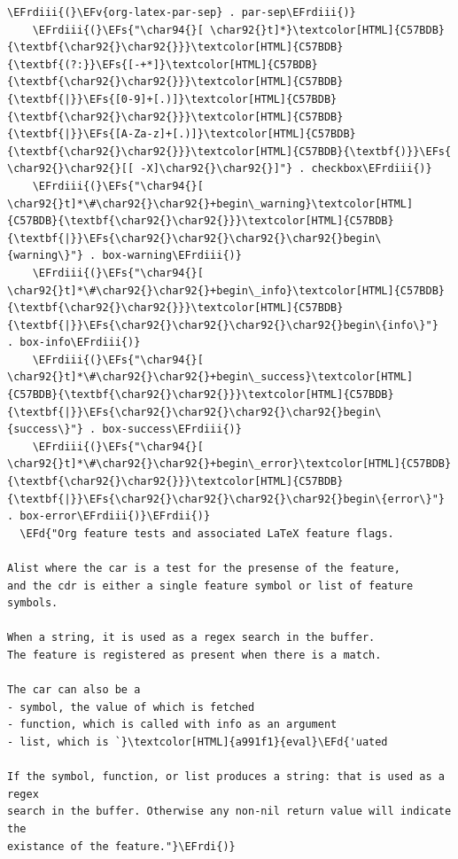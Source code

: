 \documentclass{scrartcl}
\newcommand{\EFd}[1]{\textcolor{EFd}{#1}} %
\newcommand{\EFs}[1]{\textcolor{EFs}{#1}} %
\newcommand{\EFv}[1]{\textcolor{EFv}{#1}} %
\newcommand{\EFrdi}[1]{#1} %
\newcommand{\EFrdii}[1]{#1} %
\newcommand{\EFrdiii}[1]{#1} %
\begin{document}
\begin{Code}
\begin{Verbatim}[]
    \EFrdiii{(}\EFv{org-latex-par-sep} . par-sep\EFrdiii{)}
    \EFrdiii{(}\EFs{"\char94{}[ \char92{}t]*}\textcolor[HTML]{C57BDB}{\textbf{\char92{}\char92{}}}\textcolor[HTML]{C57BDB}{\textbf{(?:}}\EFs{[-+*]}\textcolor[HTML]{C57BDB}{\textbf{\char92{}\char92{}}}\textcolor[HTML]{C57BDB}{\textbf{|}}\EFs{[0-9]+[.)]}\textcolor[HTML]{C57BDB}{\textbf{\char92{}\char92{}}}\textcolor[HTML]{C57BDB}{\textbf{|}}\EFs{[A-Za-z]+[.)]}\textcolor[HTML]{C57BDB}{\textbf{\char92{}\char92{}}}\textcolor[HTML]{C57BDB}{\textbf{)}}\EFs{ \char92{}\char92{}[[ -X]\char92{}\char92{}]"} . checkbox\EFrdiii{)}
    \EFrdiii{(}\EFs{"\char94{}[ \char92{}t]*\#\char92{}\char92{}+begin\_warning}\textcolor[HTML]{C57BDB}{\textbf{\char92{}\char92{}}}\textcolor[HTML]{C57BDB}{\textbf{|}}\EFs{\char92{}\char92{}\char92{}\char92{}begin\{warning\}"} . box-warning\EFrdiii{)}
    \EFrdiii{(}\EFs{"\char94{}[ \char92{}t]*\#\char92{}\char92{}+begin\_info}\textcolor[HTML]{C57BDB}{\textbf{\char92{}\char92{}}}\textcolor[HTML]{C57BDB}{\textbf{|}}\EFs{\char92{}\char92{}\char92{}\char92{}begin\{info\}"}       . box-info\EFrdiii{)}
    \EFrdiii{(}\EFs{"\char94{}[ \char92{}t]*\#\char92{}\char92{}+begin\_success}\textcolor[HTML]{C57BDB}{\textbf{\char92{}\char92{}}}\textcolor[HTML]{C57BDB}{\textbf{|}}\EFs{\char92{}\char92{}\char92{}\char92{}begin\{success\}"} . box-success\EFrdiii{)}
    \EFrdiii{(}\EFs{"\char94{}[ \char92{}t]*\#\char92{}\char92{}+begin\_error}\textcolor[HTML]{C57BDB}{\textbf{\char92{}\char92{}}}\textcolor[HTML]{C57BDB}{\textbf{|}}\EFs{\char92{}\char92{}\char92{}\char92{}begin\{error\}"}     . box-error\EFrdiii{)}\EFrdii{)}
  \EFd{"Org feature tests and associated LaTeX feature flags.

Alist where the car is a test for the presense of the feature,
and the cdr is either a single feature symbol or list of feature symbols.

When a string, it is used as a regex search in the buffer.
The feature is registered as present when there is a match.

The car can also be a
- symbol, the value of which is fetched
- function, which is called with info as an argument
- list, which is `}\textcolor[HTML]{a991f1}{eval}\EFd{'uated

If the symbol, function, or list produces a string: that is used as a regex
search in the buffer. Otherwise any non-nil return value will indicate the
existance of the feature."}\EFrdi{)}
\end{Verbatim}
\end{Code}
\end{document}
